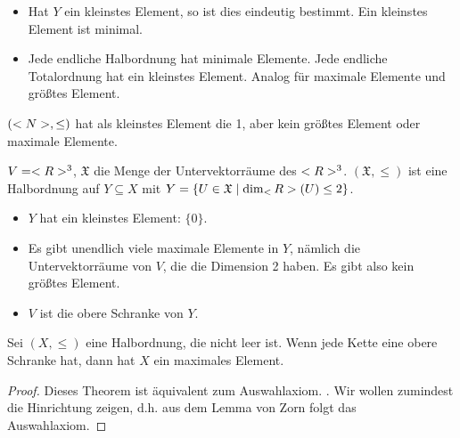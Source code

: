 \begin{remark}
	\begin{itemize}
		\item Hat $Y$ ein kleinstes Element, so ist dies eindeutig bestimmt. Ein kleinstes Element ist minimal.
		\item Jede endliche Halbordnung hat minimale Elemente. Jede endliche Totalordnung hat ein kleinstes Element. Analog für maximale Elemente und größtes Element.
	\end{itemize}
\end{remark}

\begin{example}
	$(<N>,\le)$ hat als kleinstes Element die 1, aber kein größtes Element oder maximale Elemente.
\end{example}

\begin{example}
	$V=<R>^3$, $\mathfrak{X}$ die Menge der Untervektorräume des $<R>^3$. $(\mathfrak{X},\le)$ ist eine Halbordnung auf $Y\subseteq X$ mit $Y=\{U\in\mathfrak{X}\mid \dim_\real(U)\le 2\}$. 
	\begin{itemize}
		\item $Y$ hat ein kleinstes Element: $\{0\}$.
		\item Es gibt unendlich viele maximale Elemente in $Y$, nämlich die Untervektorräume von $V$, die die Dimension 2 haben. Es gibt also kein größtes Element.
		\item $V$ ist die obere Schranke von $Y$.
	\end{itemize}
\end{example}

\begin{theorem}
	Sei $(X,\le)$ eine Halbordnung, die nicht leer ist. Wenn jede Kette eine obere Schranke hat, dann hat $X$ ein maximales Element.
\end{theorem}
\begin{proof}
	Dieses Theorem ist äquivalent zum Auswahlaxiom. \frownie{}. Wir wollen zumindest die Hinrichtung zeigen, d.h. aus dem Lemma von Zorn folgt das Auswahlaxiom.
\end{proof}

